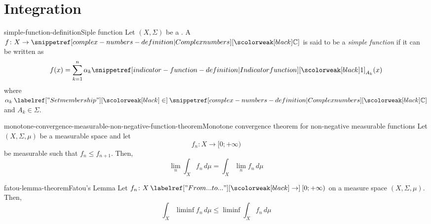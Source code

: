 \documentclass[preview]{standalone}
\begin{document}
\genpage

\section{Integration}

\begin{snippetdefinition}{simple-function-definition}{Siple function}
    Let \((X, \Sigma)\) be a \measurablespace. A \function \(f \colon X \to \complexnumbers\)
    is said to be a \emph{simple function} if it can be written as
    \[
        f(x) = \sum_{k=1}^n \alpha_k \indicator_{A_k}(x)
    \]
    where \(\alpha_k \in \complexnumbers\) and \(A_k \in \Sigma\).
\end{snippetdefinition}

\begin{snippettheorem}{monotone-convergence-measurable-non-negative-function-theorem}{Monotone convergence theorem for non-negative measurable functions}
    Let \((X, \Sigma, \mu)\) be a measurable space and let
    \[
        f_n \colon X \to [0; +\infty)
    \] be measurable
    such that \(f_n \leq f_{n+1}\). Then,
    \[
        \lim_n \int_X f_n\,d\mu = \int_X \lim_n f_n\,d\mu
    \]
\end{snippettheorem}

\begin{snippettheorem}{fatou-lemma-theorem}{Fatou's Lemma}
    Let \(f_n \colon X \fromto [0; +\infty)\) on a measure space \((X, \Sigma, \mu)\). Then,
    \[
        \int_X \liminf f_n \, d\mu \leq \liminf \int_X f_n \, d\mu
    \]
\end{snippettheorem}
\end{document}
